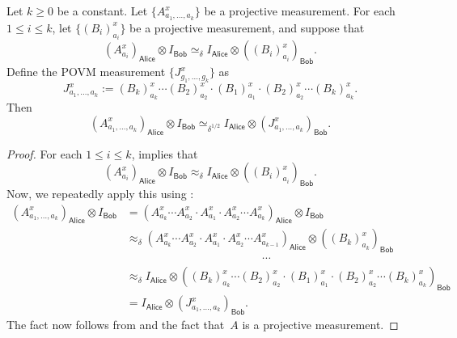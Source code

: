 \documentclass[11pt]{article}
\newcommand{\reg}[1]{{\mathsf{#1}}}
\begin{document}
\begin{fact}\label{fact:sandwich}
Let $k \geq 0$ be a constant.
Let $\{A^x_{a_1, \ldots, a_k}\}$ be a projective measurement.
For each $1 \leq i \leq k$, let $\{(B_i)^x_{a_i}\}$ be a projective measurement, and suppose that
\begin{equation}\label{eq:no-take-only-throw}
(A^x_{a_i})_{\reg{Alice}} \otimes I_{\reg{Bob}} \simeq_{\delta} I_{\reg{Alice}} \otimes ((B_i)^x_{a_i})_{\reg{Bob}}.
\end{equation}
Define the POVM measurement $\{J^x_{g_1, \ldots, g_k}\}$ as
\begin{equation*}
J^x_{a_1, \ldots, a_k} := (B_k)^x_{a_k} \cdots (B_2)^x_{a_2} \cdot (B_1)^x_{a_1} \cdot (B_2)^x_{a_2} \cdots (B_k)^x_{a_k}.
\end{equation*}
Then
\begin{equation*}
(A^x_{a_1, \ldots, a_k})_{\reg{Alice}} \otimes I_{\reg{Bob}} \simeq_{\delta^{1/2}} I_{\reg{Alice}} \otimes (J^x_{a_1, \ldots, a_k})_{\reg{Bob}}.
\end{equation*}
\end{fact}
\begin{proof}
For each $1 \leq i \leq k$, 
 implies that
\begin{equation*}
(A^x_{a_i})_{\reg{Alice}} \otimes I_{\reg{Bob}} \approx_{\delta} I_{\reg{Alice}} \otimes ((B_i)^x_{a_i})_{\reg{Bob}}.
\end{equation*}
Now, we repeatedly apply this using :
\begin{align*}
(A^x_{a_1, \ldots, a_k})_{\reg{Alice}} \otimes I_{\reg{Bob}}
& = (A^x_{a_k} \cdots A^x_{a_2} \cdot A^x_{a_1} \cdot A^x_{a_2} \cdots A^x_{a_{k}})_{\reg{Alice}} \otimes I_{\reg{Bob}}\\
& \approx_{\delta} (A^x_{a_k} \cdots A^x_{a_2} \cdot A^x_{a_1} \cdot A^x_{a_2} \cdots A^x_{a_{k-1}})_{\reg{Alice}} \otimes ((B_k)^x_{a_k})_{\reg{Bob}}\\
&\qquad\qquad\qquad \qquad \qquad \qquad \cdots\\
& \approx_{\delta} I_{\reg{Alice}} \otimes ((B_k)^x_{a_k} \cdots (B_2)^x_{a_2} \cdot (B_1)^x_{a_1} \cdot (B_2)^x_{a_2} \cdots (B_k)^x_{a_k})_{\reg{Bob}}\\
& = I_{\reg{Alice}} \otimes (J^x_{a_1, \ldots, a_k})_{\reg{Bob}}.
\end{align*}
The fact now follows from  and the fact that~$A$ is a projective measurement.
\end{proof}
\end{document}

